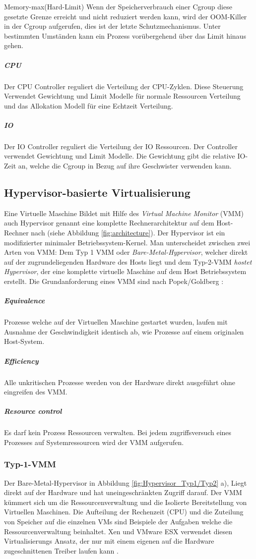 Memory-max(Hard-Limit)
Wenn der Speicherverbrauch einer Cgroup diese gesetzte Grenze erreicht und nicht reduziert werden kann, wird der OOM-Killer in der Cgroup aufgerufen, dies ist der letzte Schutzmechanismus. Unter bestimmten Umständen kann ein Prozess vorübergehend über das Limit hinaus gehen.

\subparagraph{CPU}
Der CPU Controller reguliert die Verteilung der CPU-Zyklen. Diese Steuerung Verwendet Gewichtung und Limit Modelle für normale Ressourcen Verteilung und das Allokation Modell für eine Echtzeit Verteilung.
\subparagraph{IO}
Der IO Controller reguliert die Verteilung der IO Ressourcen. Der Controller verwendet Gewichtung und Limit Modelle. Die Gewichtung gibt die relative IO-Zeit an, welche die Cgroup in Bezug auf ihre Geschwister verwenden kann.

\pagebreak
\subsection{Hypervisor-basierte Virtualisierung}
Eine Virtuelle Maschine Bildet mit Hilfe des \glqq{}\emph{Virtual Machine Monitor}\grqq{} (VMM) auch Hypervisor genannt eine komplette Rechnerarchitektur auf dem Host-Rechner nach (siehe Abbildung \ref{fig:architecture}). Der Hypervisor ist ein modifizierter minimaler Betriebssystem-Kernel. Man unterscheidet zwischen zwei Arten von VMM: Dem Typ 1 VMM oder \glqq{}\emph{Bare-Metal-Hypervisor}\grqq{}, welcher direkt auf der zugrundeliegenden Hardware des Hosts liegt und dem Typ-2-VMM \glqq{}\emph{hostet Hypervisor}\grqq{}, der eine komplette virtuelle Maschine auf dem Host Betriebssystem erstellt. Die Grundanforderung eines VMM sind nach Popek/Goldberg \cite{Popek1974FormalArchitectures,Glatz2015Betriebssysteme}:


 \subparagraph{Equivalence} 
 Prozesse welche auf der Virtuellen Maschine gestartet wurden, laufen mit Ausnahme der Geschwindigkeit identisch ab, wie Prozesse auf einem originalen Host-System.
 
\subparagraph{Efficiency} 
Alle unkritischen Prozesse werden von der Hardware direkt ausgeführt ohne eingreifen des VMM.

\subparagraph{Resource control} 
Es darf kein Prozess Ressourcen verwalten. Bei jedem zugriffsversuch eines Prozesses auf Systemressourcen wird der VMM aufgerufen.



\subsubsection{Typ-1-VMM}
Der Bare-Metal-Hypervisor in Abbildung \ref{fig:Hypervisor_Typ1/Typ2} a), Liegt direkt auf der Hardware und hat uneingeschränkten Zugriff darauf. Der VMM kümmert sich um die Ressourcenverwaltung und die Isolierte Bereitstellung von Virtuellen Maschinen. Die Aufteilung der Rechenzeit (CPU) und die Zuteilung von Speicher auf die einzelnen VMs sind Beispiele der Aufgaben welche die Ressourcenverwaltung beinhaltet. Xen \cite{Install2018XenArchitecture} und VMware ESX \cite{Go-to2018ESXi} verwendet diesen Virtualisierungs Ansatz, der nur mit einem eigenen auf die Hardware zugeschnittenen Treiber laufen kann \cite{Glatz2015Betriebssysteme}.

